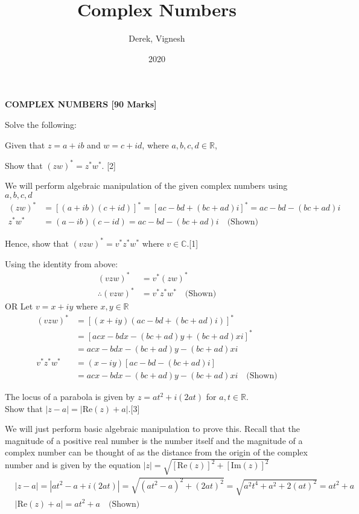 \documentclass[12pt, a4 paper]{article}
\title{Complex Numbers}
\author{Derek, Vignesh}
\date{2020}
\begin{document}
\maketitle

\textbf{COMPLEX NUMBERS [90 Marks]}
\begin{outline}[enumerate]
	\1 Solve the following: %

	\2 Given that $z=a+ib$ and $w=c+id$, where $a,b,c,d \in \mathbb{R}$, %

	\3 Show that $(zw)^*=z^*w^*$. \hfill[2]
	\begin{answer}
		We will perform algebraic manipulation of the given complex numbers using $a,b,c,d$
		\begin{align*}
			(zw)^* & = [(a+ib)(c+id)]^* = [ac-bd+(bc+ad)i]^* = ac-bd-(bc+ad)i \\
			z^*w^* & = (a-ib)(c-id) = ac-bd-(bc+ad)i\quad\textrm{(Shown)}
		\end{align*}
	\end{answer}
	\3 Hence, show that $(vzw)^*=v^*z^*w^*$ where $v \in \mathbb{C}$.\hfill[1]
	\begin{answer}
		Using the identity from above:
		\begin{align*}
			(vzw)^*            & = v^*(zw)^*                      \\
			\therefore (vzw)^* & = v^*z^*w^*\quad\textrm{(Shown)}
		\end{align*}
		OR Let $v=x+iy$ where $x,y \in \mathbb{R}$
		\begin{align*}
			(vzw)^*   & = [(x+iy)(ac-bd+(bc+ad)i)]^*                      \\
			          & = [acx-bdx-(bc+ad)y+(bc+ad)xi]^*                  \\
			          & = acx-bdx-(bc+ad)y-(bc+ad)xi                      \\
			v^*z^*w^* & = (x-iy)[ac-bd-(bc+ad)i]                          \\
			          & = acx-bdx-(bc+ad)y-(bc+ad)xi\quad\textrm{(Shown)}
		\end{align*}
	\end{answer}

	\2 The locus of a parabola is given by $z=at^2+i(2at)$ for $a,t \in \mathbb{R}$.\\ Show that $|z-a|=|\textrm{Re}(z)+a|$.\hfill[3] %
	\begin{answer}
		We will just perform basic algebraic manipulation to prove this. Recall that the magnitude of a positive real number is the number itself and the magnitude of a complex number can be thought of as the distance from the origin of the complex number and is given by the equation $|z|=\sqrt{[\textrm{Re}(z)]^2+[\textrm{Im}(z)]^2}$
		\begin{align*}
			  & |z-a| = |at^2-a+i(2at)| = \sqrt{(at^2-a)^2+(2at)^2} = \sqrt{a^2t^4+a^2+2(at)^2} = at^2 + a \\
			  & |\textrm{Re}(z)+a| = at^2+a \quad\textrm{(Shown)}
		\end{align*}
	\end{answer}


\end{outline}
\end{document}
